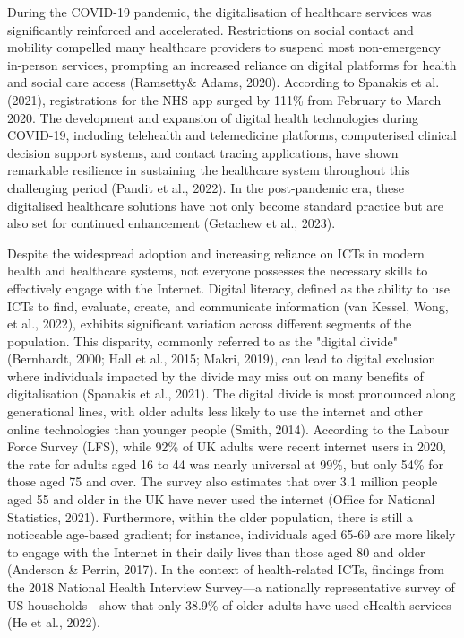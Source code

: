 During the COVID-19 pandemic, the digitalisation of healthcare services was significantly reinforced and accelerated. Restrictions on social contact and mobility compelled many healthcare providers to suspend most non-emergency in-person services, prompting an increased reliance on digital platforms for health and social care access (Ramsetty\& Adams, 2020). According to Spanakis et al. (2021), registrations for the NHS app surged by 111\% from February to March 2020. The development and expansion of digital health technologies during COVID-19, including telehealth and telemedicine platforms, computerised clinical decision support systems, and contact tracing applications, have shown remarkable resilience in sustaining the healthcare system throughout this challenging period (Pandit et al., 2022). In the post-pandemic era, these digitalised healthcare solutions have not only become standard practice but are also set for continued enhancement (Getachew et al., 2023).

Despite the widespread adoption and increasing reliance on ICTs in modern health and healthcare systems, not everyone possesses the necessary skills to effectively engage with the Internet. Digital literacy, defined as the ability to use ICTs to find, evaluate, create, and communicate information (van Kessel, Wong, et al., 2022), exhibits significant variation across different segments of the population. This disparity, commonly referred to as the "digital divide" (Bernhardt, 2000; Hall et al., 2015; Makri, 2019), can lead to digital exclusion where individuals impacted by the divide may miss out on many benefits of digitalisation (Spanakis et al., 2021). The digital divide is most pronounced along generational lines, with older adults less likely to use the internet and other online technologies than younger people (Smith, 2014). According to the Labour Force Survey (LFS), while 92\% of UK adults were recent internet users in 2020, the rate for adults aged 16 to 44 was nearly universal at 99\%, but only 54\% for those aged 75 and over. The survey also estimates that over 3.1 million people aged 55 and older in the UK have never used the internet (Office for National Statistics, 2021). Furthermore, within the older population, there is still a noticeable age-based gradient; for instance, individuals aged 65-69 are more likely to engage with the Internet in their daily lives than those aged 80 and older (Anderson \& Perrin, 2017). In the context of health-related ICTs, findings from the 2018 National Health Interview Survey—a nationally representative survey of US households—show that only 38.9\% of older adults have used eHealth services (He et al., 2022).

